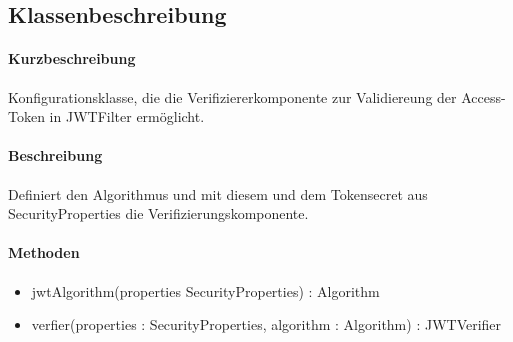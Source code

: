 \subsection{Klassenbeschreibung}%
\paragraph*{Kurzbeschreibung}
Konfigurationsklasse, die die Verifiziererkomponente zur Validiereung der Access-Token in JWTFilter ermöglicht.
\paragraph*{Beschreibung}
Definiert den Algorithmus und mit diesem und dem Tokensecret aus \dq SecurityProperties \dq die Verifizierungskomponente.
\paragraph*{Methoden}
\begin{itemize}
	\item jwtAlgorithm(properties SecurityProperties) : Algorithm
    \item verfier(properties : SecurityProperties, algorithm : Algorithm) : JWTVerifier
\end{itemize}	
